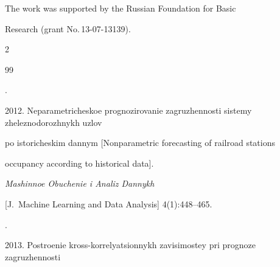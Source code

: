





\vspace*{-12pt}



\Ack

\noindent

The work was supported by the Russian Foundation for Basic

Research (grant No.\,13-07-13139).





  \begin{multicols}{2}



\renewcommand{\bibname}{\protect\rmfamily References}




{\small\frenchspacing

{%


\begin{thebibliography}{99}




.

2012. Neparametricheskoe prognozirovanie zagruzhennosti sistemy zheleznodorozhnykh uzlov

po istoricheskim dannym [Nonparametric forecasting of railroad stations

occupancy according to historical data].

\textit{Mashinnoe Obuchenie i Analiz Dannykh}

[J.~Machine Learning and Data Analysis] 4(1):448--465.




.

2013. Postroenie kross-korrelyatsionnykh zavisimostey pri prognoze zagruzhennosti


\end{thebibliography}}}
\end{multicols}
